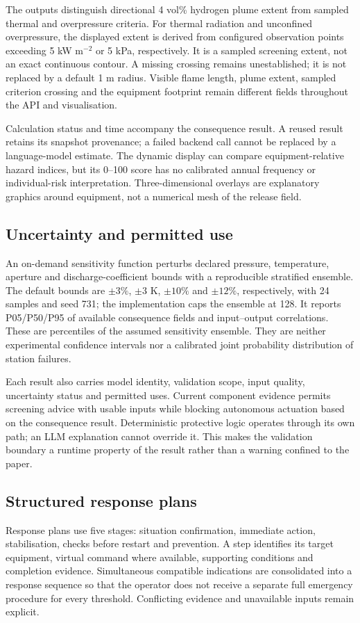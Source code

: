 \documentclass[12pt,a4paper]{article}
\begin{document}
The outputs distinguish directional 4 vol\% hydrogen plume extent from sampled
thermal and overpressure criteria. For thermal radiation and unconfined
overpressure, the displayed extent is derived from configured observation points
exceeding 5 kW m$^{-2}$ or 5 kPa, respectively. It is a sampled screening
extent, not an exact continuous contour. A missing crossing remains unestablished;
it is not replaced by a default 1 m radius. Visible flame length, plume extent,
sampled criterion crossing and the equipment footprint remain different fields
throughout the API and visualisation.

Calculation status and time accompany the consequence result. A reused result
retains its snapshot provenance; a failed backend call cannot be replaced by a
language-model estimate. The dynamic display can compare equipment-relative
hazard indices, but its 0--100 score has no calibrated annual frequency or
individual-risk interpretation. Three-dimensional overlays are explanatory
graphics around equipment, not a numerical mesh of the release field.

\subsection{Uncertainty and permitted use}
An on-demand sensitivity function perturbs declared pressure, temperature,
aperture and discharge-coefficient bounds with a reproducible stratified
ensemble. The default bounds are $\pm3\%$, $\pm3$ K, $\pm10\%$ and
$\pm12\%$, respectively, with 24 samples and seed 731; the implementation caps
the ensemble at 128. It reports P05/P50/P95 of available consequence fields and
input--output correlations. These are percentiles of the assumed sensitivity
ensemble. They are neither experimental confidence intervals nor a calibrated
joint probability distribution of station failures.

Each result also carries model identity, validation scope, input quality,
uncertainty status and permitted uses. Current component evidence permits
screening advice with usable inputs while blocking autonomous actuation based
on the consequence result. Deterministic protective logic operates through its
own path; an LLM explanation cannot override it. This makes the validation
boundary a runtime property of the result rather than a warning confined to
the paper.

\subsection{Structured response plans}
Response plans use five stages: situation confirmation, immediate action,
stabilisation, checks before restart and prevention. A step identifies its
target equipment, virtual command where available, supporting conditions and
completion evidence. Simultaneous compatible indications are consolidated into
a response sequence so that the operator does not receive a separate full
emergency procedure for every threshold. Conflicting evidence and unavailable
inputs remain explicit.
\end{document}
